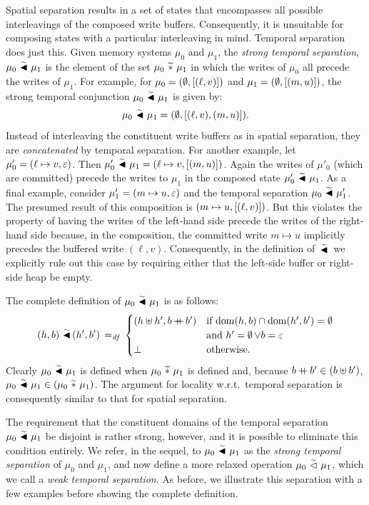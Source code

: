 \documentclass[11pt]{report}         %
\begin{document}
Spatial separation results in a set of states that encompasses all possible interleavings of the composed write buffers. Consequently, it is unsuitable for composing states with a particular interleaving in mind. Temporal separation does just this. Given memory systems $\mu_0$ and $\mu_1$, the \emph{strong temporal separation}, $\mu_0 \operatorname{\,\widetilde{\blacktriangleleft}\,} \mu_1$ is the element of the set $\mu_0 \operatorname{\,\widetilde{\ast}\,} \mu_1$ in which the writes of $\mu_0$ all precede the writes of $\mu_1$. For example, for $\mu_0 = (\operatorname{\emptyset},\left[(\ell,v)\right])$ and $\mu_1 = (\operatorname{\emptyset},\left[(m,u)\right])$, the strong temporal conjunction $\mu_0 \operatorname{\,\widetilde{\blacktriangleleft}\,} \mu_1$ is given by: \[\mu_0 \operatorname{\,\widetilde{\blacktriangleleft}\,} \mu_1 = (\operatorname{\emptyset},\left[(\ell,v),(m,u)\right]).\] Instead of interleaving the constituent write buffers as in spatial separation, they are \emph{concatenated} by temporal separation. For another example, let $\mu'_0 = (\ell \mapsto v, \varepsilon)$. Then $\mu'_0 \operatorname{\,\widetilde{\blacktriangleleft}\,} \mu_1 = (\ell \mapsto v, \left[(m,u)\right])$. Again the writes of $\mu'_0$ (which are committed) precede the writes to $\mu_1$ in the composed state $\mu'_0 \operatorname{\,\widetilde{\blacktriangleleft}\,} \mu_1$. As a final example, consider $\mu'_1 = (m \mapsto u, \varepsilon)$ and the temporal separation $\mu_0 \operatorname{\,\widetilde{\blacktriangleleft}\,} \mu'_1$. The presumed result of this composition is $(m \mapsto u, \left[(\ell,v)\right])$. But this violates the property of having the writes of the left-hand side precede the writes of the right-hand side because, in the composition, the committed write $m \mapsto u$ implicitly precedes the buffered write $(\ell,v)$. Consequently, in the definition of $\operatorname{\,\widetilde{\blacktriangleleft}\,}$ we explicitly rule out this case by requiring either that the left-side buffer or right-side heap be empty. 

The complete definition of $\mu_0 \operatorname{\,\widetilde{\blacktriangleleft}\,} \mu_1$ is as follows: \[ (h,b) \operatorname{\,\widetilde{\blacktriangleleft}\,} (h',b') \operatorname{\;=_{\mathit{df}}\;} \begin{cases}
  (h \uplus h', b \operatorname{+\!\!\!+} b') & \text{if $\operatorname{\mathrm{dom}}(h,b) \cap \operatorname{\mathrm{dom}}(h',b') = \operatorname{\emptyset}$} \\ & \text{and $h' = \operatorname{\emptyset} \vee b = \varepsilon$} \\
  \bot & \text{otherwise.}
\end{cases}\] Clearly $\mu_0 \operatorname{\,\widetilde{\blacktriangleleft}\,} \mu_1$ is defined when $\mu_0 \operatorname{\,\widetilde{\ast}\,} \mu_1$ is defined and, because $b \operatorname{+\!\!\!+} b' \in (b \uplus b')$, $\mu_0 \operatorname{\,\widetilde{\blacktriangleleft}\,} \mu_1 \in (\mu_0 \operatorname{\,\widetilde{\ast}\,} \mu_1)$. The argument for locality w.r.t.\ temporal separation is consequently similar to that for spatial separation. 

The requirement that the constituent domains of the temporal separation $\mu_0 \operatorname{\,\widetilde{\blacktriangleleft}\,} \mu_1$ be disjoint is rather strong, however, and it is possible to eliminate this condition entirely. We refer, in the sequel, to  $\mu_0 \operatorname{\,\widetilde{\blacktriangleleft}\,} \mu_1$ as the \emph{strong temporal separation} of $\mu_0$ and $\mu_1$, and now define a more relaxed operation $\mu_0 \operatorname{\,\widetilde{\vartriangleleft}\,} \mu_1$, which we call a \emph{weak temporal separation}. As before, we illustrate this separation with a few examples before showing the complete definition. 
\end{document}

